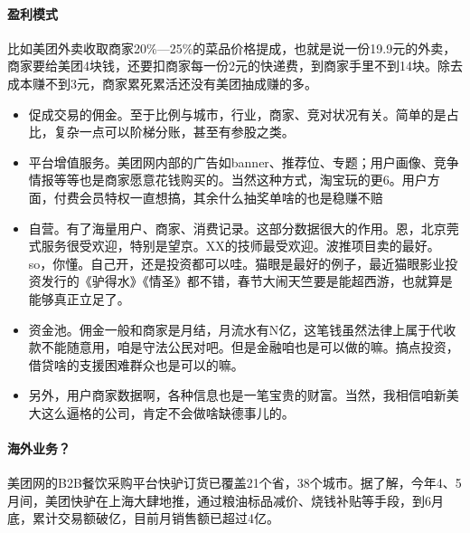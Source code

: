 \documentclass[letterpaper,11pt,english]{sphinxmanual}
\begin{document}
\paragraph{盈利模式}
\label{\detokenize{chapter_company/meituan:id8}}
比如美团外卖收取商家20\%—25\%的菜品价格提成，也就是说一份19.9元的外卖，商家要给美团4块钱，还要扣商家每一份2元的快递费，到商家手里不到14块。除去成本赚不到3元，商家累死累活还没有美团抽成赚的多。%
\begin{footnote}[913]\sphinxAtStartFootnote
{}
%
\end{footnote}
\begin{itemize}
\item {} 
促成交易的佣金。至于比例与城市，行业，商家、竞对状况有关。简单的是占比，复杂一点可以阶梯分账，甚至有参股之类。

\item {} 
平台增值服务。美团网内部的广告如banner、推荐位、专题；用户画像、竞争情报等等也是商家愿意花钱购买的。当然这种方式，淘宝玩的更6。用户方面，付费会员特权一直想搞，其余什么抽奖单啥的也是稳赚不赔

\item {} 
自营。有了海量用户、商家、消费记录。这部分数据很大的作用。恩，北京莞式服务很受欢迎，特别是望京。XX的技师最受欢迎。波推项目卖的最好。so，你懂。自己开，还是投资都可以哇。猫眼是最好的例子，最近猫眼影业投资发行的《驴得水》《情圣》都不错，春节大闹天竺要是能超西游，也就算是能够真正立足了。

\item {} 
资金池。佣金一般和商家是月结，月流水有N亿，这笔钱虽然法律上属于代收款不能随意用，咱是守法公民对吧。但是金融咱也是可以做的嘛。搞点投资，借贷啥的支援困难群众也是可以的嘛。

\item {} 
另外，用户商家数据啊，各种信息也是一笔宝贵的财富。当然，我相信咱新美大这么逼格的公司，肯定不会做啥缺德事儿的。%
\begin{footnote}[914]\sphinxAtStartFootnote
{}
%
\end{footnote}

\end{itemize}


\paragraph{海外业务？}
\label{\detokenize{chapter_company/meituan:id9}}
美团网的B2B餐饮采购平台快驴订货已覆盖21个省，38个城市。据了解，今年4、5月间，美团快驴在上海大肆地推，通过粮油标品减价、烧钱补贴等手段，到6月底，累计交易额破亿，目前月销售额已超过4亿。
\end{document}
